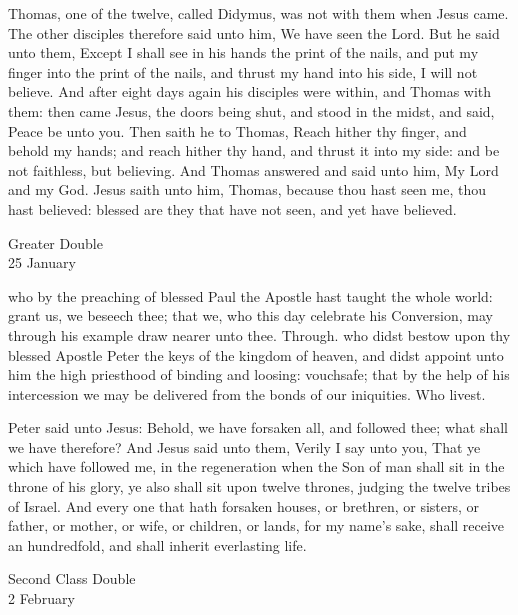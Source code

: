  Thomas, one of the twelve, called Didymus, was not with them when Jesus came. The other disciples therefore said unto him, We have seen the Lord. But he said unto them, Except I shall see in his hands the print of the nails, and put my finger into the print of the nails, and thrust my hand into his side, I will not believe. And after eight days again his disciples were within, and Thomas with them: then came Jesus, the doors being shut, and stood in the midst, and said, Peace be unto you. Then saith he to Thomas, Reach hither thy finger, and behold my hands; and reach hither thy hand, and thrust it into my side: and be not faithless, but believing. And Thomas answered and said unto him, My Lord and my God. Jesus saith unto him, Thomas, because thou hast seen me, thou hast believed: blessed are they that have not seen, and yet have believed.

\begin{inhead}
    {Greater Double\\
25 January}
\end{inhead}
\collect
{} who by the preaching of blessed Paul the Apostle hast taught the whole world: grant us, we beseech thee; that we, who this day celebrate his Conversion, may through his example draw nearer unto thee. Through.
 who didst bestow upon thy blessed Apostle Peter the keys of the kingdom of heaven, and didst appoint unto him the high priesthood of binding and loosing: vouchsafe; that by the help of his intercession we may be delivered from the bonds of our iniquities. Who livest.

 Peter said unto Jesus: Behold, we have forsaken all, and followed thee; what shall we have therefore? And Jesus said unto them, Verily I say unto you, That ye which have followed me, in the regeneration when the Son of man shall sit in the throne of his glory, ye also shall sit upon twelve thrones, judging the twelve tribes of Israel. And every one that hath forsaken houses, or brethren, or sisters, or father, or mother, or wife, or children, or lands, for my name's sake, shall receive an hundredfold, and shall inherit everlasting life.

\begin{inhead}
    {Second Class Double\\
2 February}
\end{inhead}

